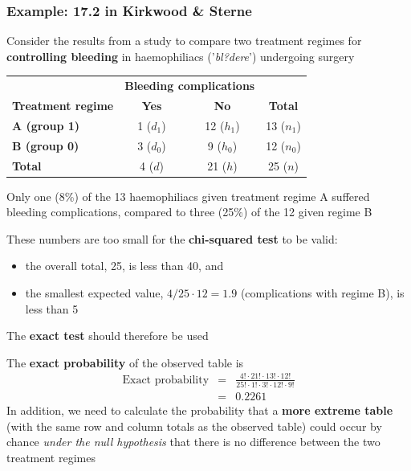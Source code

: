 \documentclass[compress, notes=hide]{beamer}
\newcommand{\hl}[1]{\textbf{#1}}
\begin{document}

\begin{frame}
\frametitle{Example: 17.2 in Kirkwood \& Sterne}
\begin{block}{}
  Consider the results from a study to compare two treatment regimes
  for \hl{controlling bleeding} in haemophiliacs ('\emph{bl?dere}')
  undergoing surgery
\begin{table}
\begin{normalsize}
\begin{tabular}{lccc}
\hline
& \multicolumn{2}{c}{\textbf{Bleeding complications}} &
\\
\cline{2-3}
\textbf{Treatment regime} & \textbf{Yes} & \textbf{No} & \textbf{Total}
\\
\hline
\textbf{A (group 1)} & 1 ($d_1$) & 12 ($h_1$) & 13 ($n_1$)
\\
\textbf{B (group 0)} & 3 ($d_0$) & 9 ($h_0$) & 12 ($n_0$)
\\
\hline
\textbf{Total} & 4 ($d$) & 21 ($h$) & 25 ($n$)
\\
\hline
\end{tabular}
\end{normalsize}
\end{table}
Only one (8\%) of the 13 haemophiliacs given treatment regime A suffered bleeding complications, compared to three (25\%) of the 12 given regime B
\end{block}
\end{frame}

\begin{frame}
\begin{block}{}
These numbers are too small for the \hl{chi-squared test} to be valid:
\begin{itemize}
\item{the overall total, 25, is less than 40, and}
\item{the smallest expected value, $4/25 \cdot 12=1.9$ (complications with regime B), is less than 5}
\end{itemize}

\vspace*{1em}
The \hl{exact test} should therefore be used
\end{block}
\end{frame}

\begin{frame}
\begin{block}{}
The \hl{exact probability} of the observed table is
\begin{eqnarray*}
\text{Exact probability} & = & \frac{4! \cdot 21! \cdot 13! \cdot 12!}{25! \cdot 1! \cdot 3! \cdot 12! \cdot 9!}
\\
& = & 0.2261
\end{eqnarray*}
In addition, we need to calculate the probability that a \hl{more
  extreme table} (with the same row and column totals as the observed
table) could occur by chance \textit{under the null hypothesis} that there is
no difference between the two treatment regimes
\end{block}
\end{frame}
\end{document}
